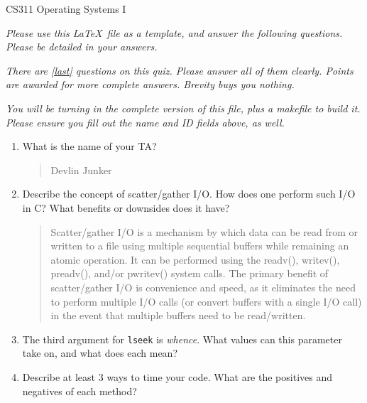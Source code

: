 \documentclass[letterpaper,10pt,onecolumn,titlepage]{article}
\begin{document}


{\Large CS311 Operating Systems I}

\emph{Please use this \LaTeX\ file as a template, and answer the following questions.
  Please be detailed in your answers.}

\emph{There are \ref{last} questions on this quiz. Please answer all of them clearly.
  Points are awarded for more complete answers. Brevity buys you nothing.}

\emph{You will be turning in the complete version of this file, plus a makefile to build
  it. Please ensure you fill out the name and ID fields above, as well.}

\begin{enumerate}%
\item What is the name of your TA?

\begin{quote}
Devlin Junker
\end{quote}

\item Describe the concept of scatter/gather I/O. How does one perform such I/O in C?
  What benefits or downsides does it have?

\begin{quote}
Scatter/gather I/O is a mechanism by which data can be read from or written to a file using multiple sequential buffers while remaining an atomic operation.  It can be performed using the readv(), writev(), preadv(), and/or pwritev() system calls.  The primary benefit of scatter/gather I/O is convenience and speed, as it eliminates the need to perform multiple I/O calls (or convert buffers with a single I/O call) in the event that multiple buffers need to be read/written.
\end{quote}

\item The third argument for \texttt{lseek} is \emph{whence}. What values can this
  parameter take on, and what does each mean?

\begin{quote}

\end{quote}

\item Describe at least 3 ways to time your code. What are the positives and negatives of
  each method?


\end{enumerate}
\end{document}
